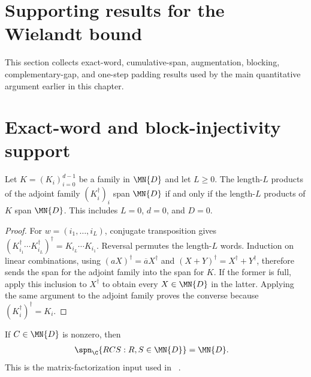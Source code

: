 \section{Supporting results for the Wielandt bound}
\label{ch:wielandt_supporting_results}
This section collects exact-word, cumulative-span, augmentation, blocking,
complementary-gap, and one-step padding results used by the main
quantitative argument earlier in this chapter.

\section{Exact-word and block-injectivity support}
\label{sec:app_wielandt_exact_word_support}

\begin{theorem}
    \label{thm:kraus_adjoint_block_injectivity}
    \leanok
    Let $K=(K_i)_{i=0}^{d-1}$ be a family in $\MN{D}$ and let $L\geq0$.
    The length-$L$ products of the adjoint family $(K_i^\dagger)_i$ span
    $\MN{D}$ if and only if the length-$L$ products of $K$ span $\MN{D}$.
    This includes $L=0$, $d=0$, and $D=0$.
\end{theorem}

\begin{proof}\leanok
    For $w=(i_1,\ldots,i_L)$, conjugate transposition gives
    $(K_{i_1}^\dagger\cdots K_{i_L}^\dagger)^\dagger
    =K_{i_L}\cdots K_{i_1}$.
    Reversal permutes the length-$L$ words. Induction on linear combinations,
    using $(aX)^\dagger=\overline aX^\dagger$ and
    $(X+Y)^\dagger=X^\dagger+Y^\dagger$, therefore sends the span for the
    adjoint family into the span for $K$.
    If the former is full, apply this inclusion to $X^\dagger$ to obtain
    every $X\in\MN{D}$ in the latter. Applying the same argument to the
    adjoint family proves the converse because $(K_i^\dagger)^\dagger=K_i$.
\end{proof}

\begin{lemma}
    \label{lem:two_sided_nonzero_matrix_span}
    \leanok
    If $C\in\MN{D}$ is nonzero, then
    \begin{align}
        \spn_{\C}\{RCS:R,S\in\MN{D}\}
         & =\MN{D}.
        \label{eq:wld_two_sided_nonzero_span}
    \end{align}
    This is the matrix-factorization input used in~%
    \cite[Lemma~3]{PerezGarcia2007Matrix}.
\end{lemma}

